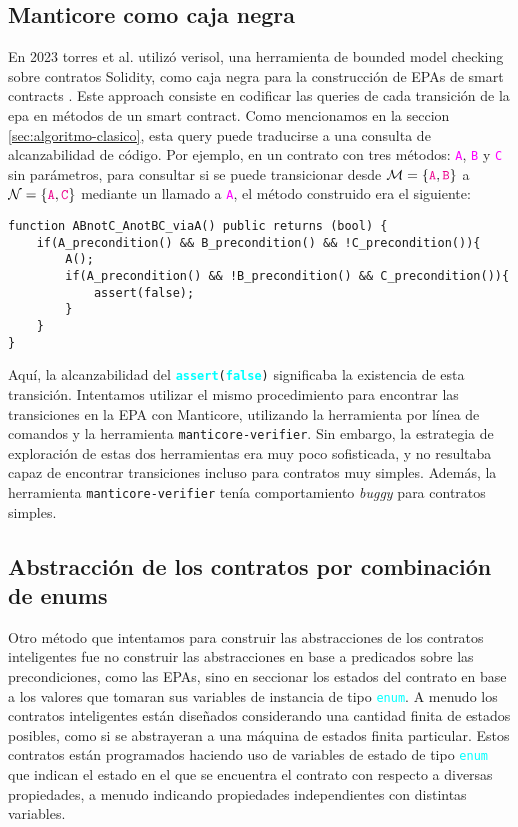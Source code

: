 \subsection{Manticore como caja negra}
En 2023 torres et al. utilizó verisol, una herramienta de bounded model checking sobre contratos Solidity, como caja negra para la construcción de EPAs de smart contracts \cite{torres} \cite{verisol}.
Este approach consiste en codificar las queries de cada transición de la epa en métodos de un smart contract.
Como mencionamos en la seccion \ref{sec:algoritmo-clasico}, esta query puede traducirse a una consulta de alcanzabilidad de código.
Por ejemplo, en un contrato con tres métodos: \textcolor{magenta}{\texttt{A}}, \textcolor{magenta}{\texttt{B}} y \textcolor{magenta}{\texttt{C}} sin parámetros, para consultar si se puede transicionar desde $\mathcal{M}=\{\textcolor{magenta}{\texttt{A}}, \textcolor{magenta}{\texttt{B}}\}$ a $\mathcal{N} = \{\textcolor{magenta}{\texttt{A}}, \textcolor{magenta}{\texttt{C}}\}$ mediante un llamado a \textcolor{magenta}{\texttt{A}}, el método construido era el siguiente:
\begin{lstlisting}[language=Solidity]
function ABnotC_AnotBC_viaA() public returns (bool) {
    if(A_precondition() && B_precondition() && !C_precondition()){
        A();
        if(A_precondition() && !B_precondition() && C_precondition()){
            assert(false);
        }
    }
}
\end{lstlisting}

Aquí, la alcanzabilidad del \texttt{\textcolor{cyan}{\textbf{assert}}(\textcolor{cyan}{\textbf{false}})} significaba la existencia de esta transición.
Intentamos utilizar el mismo procedimiento para encontrar las transiciones en la EPA con Manticore, utilizando la herramienta por línea de comandos y la herramienta \texttt{manticore-verifier}.
Sin embargo, la estrategia de exploración de estas dos herramientas era muy poco sofisticada, y no resultaba capaz de encontrar transiciones incluso para contratos muy simples.
Además, la herramienta \texttt{manticore-verifier} tenía comportamiento \textit{buggy} para contratos simples.

\subsection{Abstracción de los contratos por combinación de enums}
Otro método que intentamos para construir las abstracciones de los contratos inteligentes fue no construir las abstracciones en base a predicados sobre las precondiciones, como las EPAs, sino en seccionar los estados del contrato en base a los valores que tomaran sus variables de instancia de tipo \textcolor{cyan}{\texttt{enum}}.
A menudo los contratos inteligentes están diseñados considerando una cantidad finita de estados posibles, como si se abstrayeran a una máquina de estados finita particular.
Estos contratos están programados haciendo uso de variables de estado de tipo \textcolor{cyan}{\texttt{enum}} que indican el estado en el que se encuentra el contrato con respecto a diversas propiedades, a menudo indicando propiedades independientes con distintas variables.

